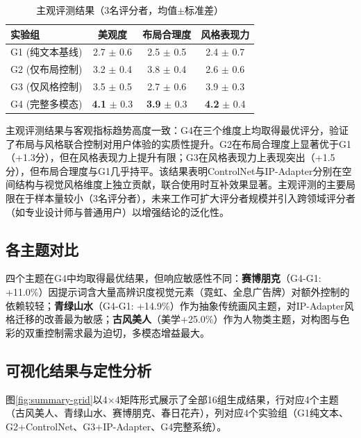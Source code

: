 \documentclass[12pt,a4paper]{ctexart}
\begin{document}
\begin{table}[H]
\centering
\caption{主观评测结果（3名评分者，均值$\pm$标准差）}
\label{tab:subjective}
\begin{tabular}{@{}lccc@{}}
\toprule
\rowcolor{tabhead}
\color{white}\textbf{实验组} & \color{white}\textbf{美观度} & \color{white}\textbf{布局合理度} & \color{white}\textbf{风格表现力} \\
\midrule
G1 (纯文本基线)   & 2.7 $\pm$ 0.6 & 2.5 $\pm$ 0.5 & 2.4 $\pm$ 0.7 \\
G2 (仅布局控制)   & 3.2 $\pm$ 0.4 & 3.8 $\pm$ 0.4 & 2.6 $\pm$ 0.6 \\
G3 (仅风格控制)   & 3.5 $\pm$ 0.5 & 2.7 $\pm$ 0.6 & 3.9 $\pm$ 0.3 \\
G4 (完整多模态)   & \textbf{4.1} $\pm$ 0.3 & \textbf{3.9} $\pm$ 0.3 & \textbf{4.2} $\pm$ 0.4 \\
\bottomrule
\end{tabular}
\end{table}

主观评测结果与客观指标趋势高度一致：G4在三个维度上均取得最优评分，验证了布局与风格联合控制对用户体验的实质性提升。G2在布局合理度上显著优于G1（+1.3分），但在风格表现力上提升有限；G3在风格表现力上表现突出（+1.5分），但布局合理度与G1几乎持平。该结果表明ControlNet与IP-Adapter分别在空间结构与视觉风格维度上独立贡献，联合使用时互补效果显著。主观评测的主要局限在于样本量较小（3名评分者），未来工作可扩大评分者规模并引入跨领域评分者（如专业设计师与普通用户）以增强结论的泛化性。

\subsection{各主题对比}

四个主题在G4中均取得最优结果，但响应敏感性不同：\textbf{赛博朋克}（G4-G1: +11.0\%）因提示词含大量高辨识度视觉元素（霓虹、全息广告牌）对额外控制的依赖较轻；\textbf{青绿山水}（G4-G1: +14.9\%）作为抽象传统画风主题，对IP-Adapter风格迁移的改善最为敏感；\textbf{古风美人}（美学+25.0\%）作为人物类主题，对构图与色彩的双重控制需求最为迫切，多模态增益最大。

\subsection{可视化结果与定性分析}

图\ref{fig:summary-grid}以4$\times$4矩阵形式展示了全部16组生成结果，行对应4个主题（古风美人、青绿山水、赛博朋克、春日花卉），列对应4个实验组（G1纯文本、G2+ControlNet、G3+IP-Adapter、G4完整系统）。
\end{document}
